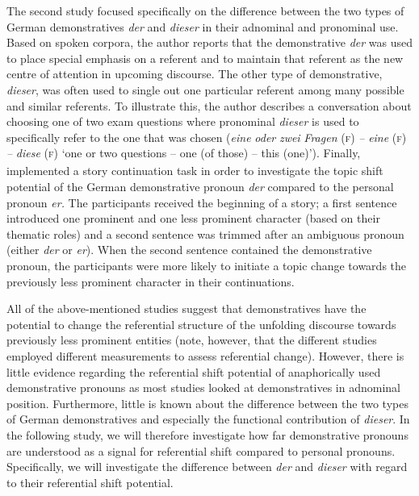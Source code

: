 \documentclass[output=paper,colorlinks,citecolor=brown]{langscibook}
\begin{document}
The second study \citep{Ahrenholz2007} focused specifically on the difference between the two types of German demonstratives \textit{der} and \textit{dieser} in their adnominal and pronominal use. Based on spoken corpora, the author reports that the demonstrative \textit{der} was used to place special emphasis on a referent and to maintain that referent as the new centre of attention in upcoming discourse. The other type of demonstrative, \textit{dieser}, was often used to single out one particular referent among many possible and similar referents. To illustrate this, the author describes a conversation about choosing one of two exam questions where pronominal \textit{dieser} is used to specifically refer to the one that was chosen (\textit{eine} \textit{oder} \textit{zwei} \textit{Fragen} \textsc{(f)} \textit{–} \textit{eine} \textsc{(f)} \textit{–} \textit{diese} \textsc{(f)}\textit{\textsubscript{} }‘one or two questions – one (of those) – this (one)’).  Finally, \citet{SchumacherEtAl2015} implemented a story continuation task in order to investigate the topic shift potential of the German demonstrative pronoun \textit{der} compared to the personal pronoun \textit{er.} The participants received the beginning of a story; a first sentence introduced one prominent and one less prominent character (based on their thematic roles) and a second sentence was trimmed after an ambiguous pronoun (either \textit{der} or \textit{er}). When the second sentence contained the demonstrative pronoun, the participants were more likely to initiate a topic change towards the previously less prominent character in their continuations. 

All of the above-mentioned studies suggest that demonstratives have the potential to change the referential structure of the unfolding discourse towards previously less prominent entities (note, however, that the different studies employed different measurements to assess referential change). However, there is little evidence regarding the referential shift potential of anaphorically used demonstrative pronouns as most studies looked at demonstratives in adnominal position. Furthermore, little is known about the difference between the two types of German demonstratives and especially the functional contribution of \textit{dieser}. In the following study, we will therefore investigate how far demonstrative pronouns are understood as a signal for referential shift compared to personal pronouns. Specifically, we will investigate the difference between \textit{der} and \textit{dieser} with regard to their referential shift potential. 
\end{document}
